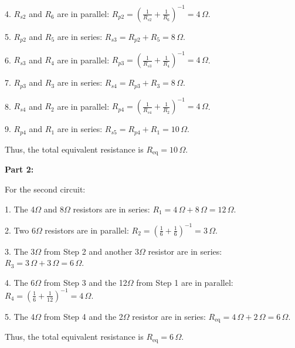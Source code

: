 \documentclass{article}
\begin{document}
4. \( R_{s2} \) and \( R_6 \) are in parallel:  
   \( R_{p2} = \left( \frac{1}{R_{s2}} + \frac{1}{R_6} \right)^{-1} = 4 \, \Omega \).

5. \( R_{p2} \) and \( R_5 \) are in series:  
   \( R_{s3} = R_{p2} + R_5 = 8 \, \Omega \).

6. \( R_{s3} \) and \( R_4 \) are in parallel:  
   \( R_{p3} = \left( \frac{1}{R_{s3}} + \frac{1}{R_4} \right)^{-1} = 4 \, \Omega \).

7. \( R_{p3} \) and \( R_3 \) are in series:  
   \( R_{s4} = R_{p3} + R_3 = 8 \, \Omega \).

8. \( R_{s4} \) and \( R_2 \) are in parallel:  
   \( R_{p4} = \left( \frac{1}{R_{s4}} + \frac{1}{R_2} \right)^{-1} = 4 \, \Omega \).

9. \( R_{p4} \) and \( R_1 \) are in series:  
   \( R_{s5} = R_{p4} + R_1 = 10 \, \Omega \).

Thus, the total equivalent resistance is \( R_{\text{eq}} = 10 \, \Omega \).

\bigskip

\textbf{Part 2:}

For the second circuit:

1. The 4$\Omega$ and 8$\Omega$ resistors are in series:  
   \( R_1 = 4 \, \Omega + 8 \, \Omega = 12 \, \Omega \).

2. Two 6$\Omega$ resistors are in parallel:  
   \( R_2 = \left( \frac{1}{6} + \frac{1}{6} \right)^{-1} = 3 \, \Omega \).

3. The 3$\Omega$ from Step 2 and another 3$\Omega$ resistor are in series:  
   \( R_3 = 3 \, \Omega + 3 \, \Omega = 6 \, \Omega \).

4. The 6$\Omega$ from Step 3 and the 12$\Omega$ from Step 1 are in parallel:  
   \( R_4 = \left( \frac{1}{6} + \frac{1}{12} \right)^{-1} = 4 \, \Omega \).

5. The 4$\Omega$ from Step 4 and the 2$\Omega$ resistor are in series:  
   \( R_{\text{eq}} = 4 \, \Omega + 2 \, \Omega = 6 \, \Omega \).

Thus, the total equivalent resistance is \( R_{\text{eq}} = 6 \, \Omega \).
\bigskip
\end{document}
